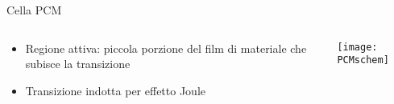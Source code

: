 \documentclass{beamer}
\begin{document}
\begin{frame}{Cella PCM}
\begin{columns}
 \begin{column}{0.5\textwidth}
  \begin{itemize}
   \item {\ev Regione attiva}: piccola porzione del film di materiale che subisce la transizione
   \item Transizione indotta per effetto Joule
  \end{itemize}
 \end{column}
 \begin{column}{0.5\textwidth}
   \texttt{[image: PCMschem]}
 \end{column}
\end{columns}
\end{frame}

\end{document}
